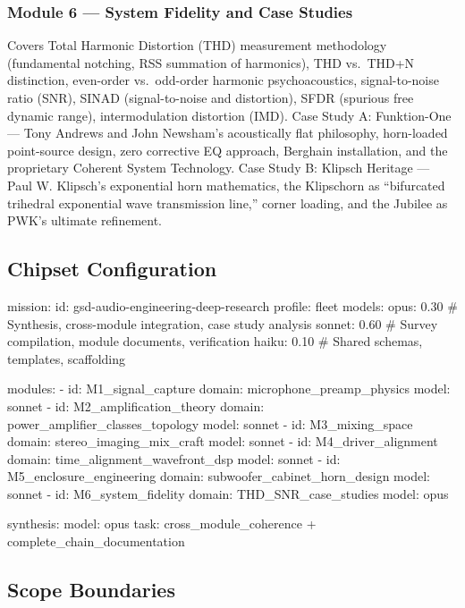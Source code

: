 \documentclass[11pt,letterpaper]{article}
\begin{document}
\subsubsection{Module 6 --- System Fidelity and Case Studies}
Covers Total Harmonic Distortion (THD) measurement methodology (fundamental notching, RSS summation of harmonics), THD vs.\ THD+N distinction, even-order vs.\ odd-order harmonic psychoacoustics, signal-to-noise ratio (SNR), SINAD (signal-to-noise and distortion), SFDR (spurious free dynamic range), intermodulation distortion (IMD). Case Study A: Funktion-One --- Tony Andrews and John Newsham's acoustically flat philosophy, horn-loaded point-source design, zero corrective EQ approach, Berghain installation, and the proprietary Coherent System Technology. Case Study B: Klipsch Heritage --- Paul W. Klipsch's exponential horn mathematics, the Klipschorn as ``bifurcated trihedral exponential wave transmission line,'' corner loading, and the Jubilee as PWK's ultimate refinement.

\subsection{Chipset Configuration}

\begin{asciibox}
mission:
  id: gsd-audio-engineering-deep-research
  profile: fleet
  models:
    opus: 0.30    # Synthesis, cross-module integration, case study analysis
    sonnet: 0.60  # Survey compilation, module documents, verification
    haiku: 0.10   # Shared schemas, templates, scaffolding

  modules:
    - id: M1_signal_capture
      domain: microphone_preamp_physics
      model: sonnet
    - id: M2_amplification_theory
      domain: power_amplifier_classes_topology
      model: sonnet
    - id: M3_mixing_space
      domain: stereo_imaging_mix_craft
      model: sonnet
    - id: M4_driver_alignment
      domain: time_alignment_wavefront_dsp
      model: sonnet
    - id: M5_enclosure_engineering
      domain: subwoofer_cabinet_horn_design
      model: sonnet
    - id: M6_system_fidelity
      domain: THD_SNR_case_studies
      model: opus

  synthesis:
    model: opus
    task: cross_module_coherence + complete_chain_documentation
\end{asciibox}

\subsection{Scope Boundaries}
\end{document}
